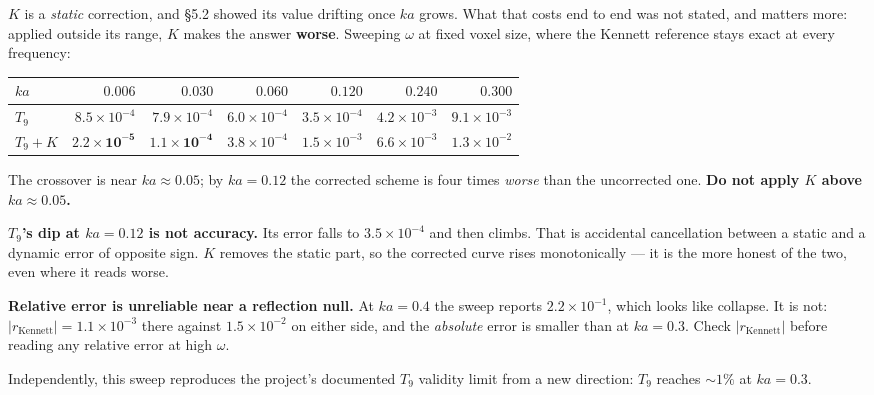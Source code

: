 \documentclass[11pt,a4paper]{article}
\newcommand{\Kren}{K}
\begin{document}
$\Kren$ is a \emph{static} correction, and \S5.2 showed its value drifting once
$ka$ grows. What that costs end to end was not stated, and matters more: applied
outside its range, $\Kren$ makes the answer \textbf{worse}. Sweeping $\omega$ at
fixed voxel size, where the Kennett reference stays exact at every frequency:

\begin{center}
\begin{tabular}{lrrrrrr}
\toprule
$ka$ & $0.006$ & $0.030$ & $0.060$ & $0.120$ & $0.240$ & $0.300$ \\
\midrule
$T_9$      & $8.5\!\times\!10^{-4}$ & $7.9\!\times\!10^{-4}$ & $6.0\!\times\!10^{-4}$
           & $3.5\!\times\!10^{-4}$ & $4.2\!\times\!10^{-3}$ & $9.1\!\times\!10^{-3}$ \\
$T_9+\Kren$ & $\bm{2.2\!\times\!10^{-5}}$ & $\bm{1.1\!\times\!10^{-4}}$ & $3.8\!\times\!10^{-4}$
           & $1.5\!\times\!10^{-3}$ & $6.6\!\times\!10^{-3}$ & $1.3\!\times\!10^{-2}$ \\
\bottomrule
\end{tabular}
\end{center}

The crossover is near $ka \approx 0.05$; by $ka = 0.12$ the corrected scheme is
four times \emph{worse} than the uncorrected one. \textbf{Do not apply $\Kren$
above $ka \approx 0.05$.}

\begin{tcolorbox}[colback=gray!5,colframe=black!62,
  title={Two things this table would be misread without}]
\textbf{$T_9$'s dip at $ka = 0.12$ is not accuracy.} Its error falls to
$3.5\times10^{-4}$ and then climbs. That is accidental cancellation between a
static and a dynamic error of opposite sign. $\Kren$ removes the static part, so
the corrected curve rises monotonically --- it is the more honest of the two,
even where it reads worse.

\textbf{Relative error is unreliable near a reflection null.} At $ka = 0.4$ the
sweep reports $2.2\times10^{-1}$, which looks like collapse. It is not:
$|r_{\text{Kennett}}| = 1.1\times10^{-3}$ there against $1.5\times10^{-2}$ on
either side, and the \emph{absolute} error is smaller than at $ka = 0.3$. Check
$|r_{\text{Kennett}}|$ before reading any relative error at high $\omega$.
\end{tcolorbox}

Independently, this sweep reproduces the project's documented $T_9$ validity
limit from a new direction: $T_9$ reaches $\sim\!1\%$ at $ka = 0.3$.
\end{document}
